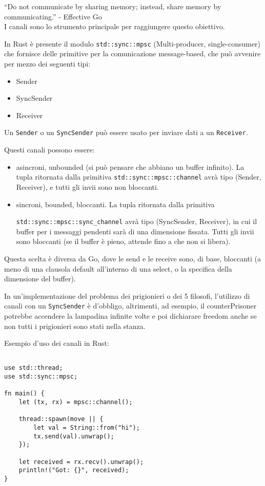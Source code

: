 ``Do not communicate by sharing memory; instead, share memory by
communicating.'' - Effective Go \\

I canali sono lo strumento principale per raggiungere questo obiettivo.

In Rust è presente il modulo \texttt{std::sync::mpsc} (Multi-producer,
single-consumer) che fornisce delle primitive per la comunicazione
message-based, che può avvenire per mezzo dei seguenti tipi:

\begin{itemize}
  \item Sender
  \item SyncSender
  \item Receiver
\end{itemize}

Un \texttt{Sender} o un \texttt{SyncSender} può essere usato per
inviare dati a un \texttt{Receiver}.

Questi canali possono essere:

\begin{itemize}
  \item asincroni, unbounded (si può pensare che abbiano un buffer infinito).
La tupla ritornata dalla primitiva \texttt{std::sync::mpsc::channel} avrà
tipo (Sender, Receiver), e tutti gli invii sono non bloccanti.

  \item sincroni, bounded, bloccanti. La tupla ritornata dalla primitiva

\texttt{std::sync::mpsc::sync\_channel} avrà tipo (SyncSender, Receiver),
in cui il buffer per i messaggi pendenti sarà di una dimensione fissata.
Tutti gli invii sono bloccanti (se il buffer è pieno, attende fino a che non si libera).
\end{itemize}

Questa scelta è diversa da Go, dove le send e le receive sono,
di base, bloccanti (a meno di una clausola default all'interno di una
select, o la specifica della dimensione del buffer).

In un'implementazione del problema dei prigionieri o dei 5 filosofi,
l'utilizzo di canali con un \texttt{SyncSender} è d'obbligo, altrimenti,
ad esempio, il counterPrisoner potrebbe accendere la lampadina
infinite volte e poi dichiarare freedom anche se non tutti i
prigionieri sono stati nella stanza.

Esempio d'uso dei canali in Rust:

\begin{verbatim}

use std::thread;
use std::sync::mpsc;

fn main() {
    let (tx, rx) = mpsc::channel();

    thread::spawn(move || {
        let val = String::from("hi");
        tx.send(val).unwrap();
    });

    let received = rx.recv().unwrap();
    println!("Got: {}", received);
}
\end{verbatim}

